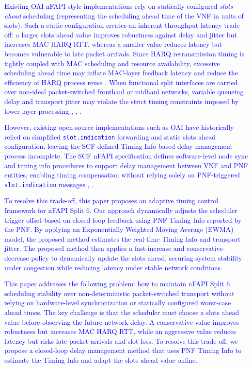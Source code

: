 \documentclass[10pt, conference, letterpaper]{IEEEtran}
\begin{document}
\textcolor{blue}{Existing OAI nFAPI-style implementations rely on statically configured \textit{slots ahead} scheduling (representing the scheduling ahead time of the VNF in units of slots). Such a static configuration creates an inherent throughput-latency trade-off: a larger slots ahead value improves robustness against delay and jitter but increases MAC HARQ RTT, whereas a smaller value reduces latency but becomes vulnerable to late packet arrivals. Since HARQ retransmission timing is tightly coupled with MAC scheduling and resource availability, excessive scheduling ahead time may inflate MAC-layer feedback latency and reduce the efficiency of HARQ process reuse \cite{Elfiky2024}. When functional split interfaces are carried over non-ideal packet-switched fronthaul or midhaul networks, variable queueing delay and transport jitter may violate the strict timing constraints imposed by lower-layer processing \cite{Diez2021}, \cite{Huang2017}, \cite{PerezRomero2023}.}

\textcolor{blue}{However, existing open-source implementations such as OAI have historically relied on simplified \texttt{slot.indication} forwarding and static slots ahead configuration, leaving the SCF-defined Timing Info based delay management process incomplete. The SCF nFAPI specification defines software-level node sync and timing info procedures to support delay management between VNF and PNF entities, enabling timing compensation without relying solely on PNF-triggered \texttt{slot.indication} messages \cite{SCF225}, \cite{SCF222}.}

\textcolor{blue}{To resolve this trade-off, this paper proposes an adaptive timing control framework for nFAPI Split 6. Our approach dynamically adjusts the scheduler trigger offset based on closed-loop feedback using PNF Timing Info reported by the PNF. By applying an Exponentially Weighted Moving Average (EWMA) model, the proposed method estimates the real-time Timing Info and transport jitter. The proposed method then applies a fast-increase and conservative-decrease policy to dynamically update the slots ahead, securing system stability under congestion while reducing latency under stable network conditions.}

\textcolor{blue}{This paper addresses the following problem: how to maintain nFAPI Split 6 scheduling stability over non-deterministic packet-switched transport without relying on hardware-level synchronization or statically configured worst-case ahead times. The key challenge is that the scheduler must choose a slots ahead value before observing the future network delay. A conservative value improves robustness but increases MAC HARQ RTT, while an aggressive value reduces latency but risks late packet arrivals and slot loss. To resolve this trade-off, we propose a closed-loop delay management method that uses PNF Timing Info to estimate the Timing Info and adapt the slots ahead value online.}
\end{document}
